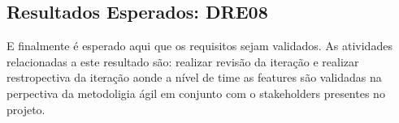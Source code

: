 	\subsection{Resultados Esperados: DRE08}
		E finalmente é esperado aqui que os requisitos sejam validados. As atividades relacionadas a este resultado são: realizar revisão da iteração e realizar restropectiva da iteração aonde a nível de time as features são validadas na perpectiva da metodoligia ágil em conjunto com o stakeholders presentes no projeto.

